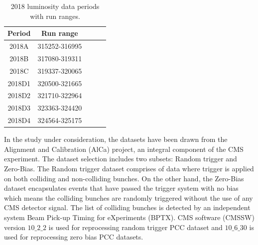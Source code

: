 \begin{table}
  \begin{center}
    \caption[Run ranges for 2022 periods]{2018 luminosity data periods with run ranges.}
    \begin{tabular}{ccccc}
    \textbf{Period}   & \textbf{Run range} \\ \hline
     2018A      &        315252-316995         \\
     2018B      &        317080-319311         \\
     2018C      &        319337-320065         \\
     2018D1     &        320500-321665        \\
     2018D2     &        321710-322964         \\
     2018D3     &        323363-324420         \\
     2018D4     &        324564-325175        \\
      \end{tabular}
    \label{tab:period_run_ranges}
  \end{center}
\end{table}

In the study under consideration, the datasets have been drawn from the Alignment and Calibration (AlCa) project, an integral component of the CMS experiment. The dataset selection includes two subsets: Random trigger and Zero-Bias. The Random trigger dataset comprises of data where trigger is applied on both colliding and non-colliding bunches. On the other hand, the Zero-Bias dataset encapsulates events that have passed the trigger system with no bias which means the colliding bunches are randomly triggered without the use of any CMS detector signal. The list of colliding bunches is detected by an independent system Beam Pick-up Timing for eXperiments (BPTX). CMS software (CMSSW) version $10{\_}2{\_}2$ is used for reprocessing random trigger PCC dataset and $10{\_}6{\_}30$  \cite{CMSReleaseNotes} is used for reprocessing zero bias PCC datasets.

